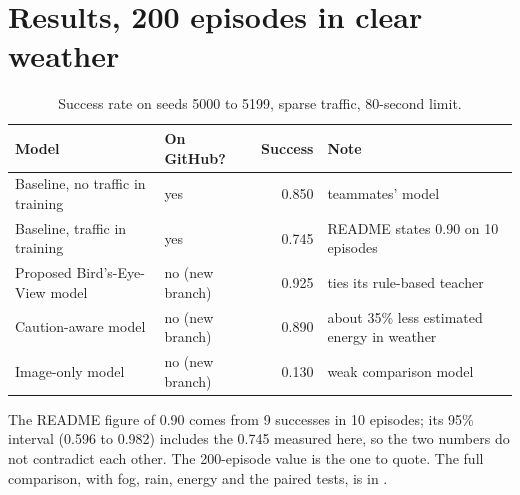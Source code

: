 \documentclass[11pt,a4paper]{article}
\begin{document}
\section{Results, 200 episodes in clear weather}
\begin{table}[H]\centering\small
\caption{Success rate on seeds 5000 to 5199, sparse traffic, 80-second limit.}
\begin{tabular}{@{}llrl@{}}\toprule
Model & On GitHub? & Success & Note\\\midrule
Baseline, no traffic in training & yes & 0.850 & teammates' model\\
Baseline, traffic in training & yes & 0.745 & README states 0.90 on 10 episodes\\
Proposed Bird's-Eye-View model & no (new branch) & 0.925 & ties its rule-based teacher\\
Caution-aware model & no (new branch) & 0.890 & about 35\% less estimated energy in weather\\
Image-only model & no (new branch) & 0.130 & weak comparison model\\\bottomrule
\end{tabular}
\end{table}
The README figure of 0.90 comes from 9 successes in 10 episodes; its 95\% interval (0.596 to 0.982) includes the 0.745 measured here, so the two numbers do not contradict each other. The 200-episode value is the one to quote. The full comparison, with fog, rain, energy and the paired tests, is in .
\end{document}
